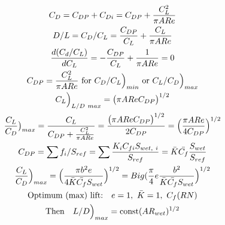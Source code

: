 \documentclass[draft=false, titlepage]{article}
\begin{document}
\begin{gather*}
\renewcommand{\arraystretch}{3.0}
    C_D = C_{DP} + C_{Di} = C_{DP} + \frac{C_L^2}{\pi AR e}\\
    D/L = C_D/C_L = \frac{C_{DP}}{C_L} + \frac{C_L}{\pi AR e}\\
    \frac{d(C_d/C_L)}{dC_L} = -\frac{C_{DP}}{C_L} + \frac{1}{\pi AR e} = 0\\
    C_{DP} = \frac{C_L^2}{\pi AR e} \text{ for } C_D/C_L\Big)_{min} \text{ or } C_L/C_D\Big)_{max}\\
    C_L\Big)_{L/D\ max} = \big( \pi AR e C_{DP}\big)^{1/2}\\
    \frac{C_L}{C_D}\big)_{max} = \frac{C_L}{C_{DP} + \frac{C_L^2}{\pi AR e}} =
    \frac{\big( \pi AR e C_{DP}\big)^{1/2}}{2C_{DP}} = \Big(\frac{\pi AR e}{4 C_{DP}}\Big)^{1/2}\\
    C_{DP} = \sum f_i/S_{ref} = \sum\frac{K_i C_{fi} S_{wet,\ i}}{S_{ref}} =
    \bar{K} \bar{C_f} \frac{S_{wet}}{S_{ref}}\\
    \frac{C_L}{C_D}\Big)_{max} = \Big(\frac{\pi b^2 e}{4 \bar{K} \bar{C_f} S_{wet}}\Big)^{1/2} =
    Big( \frac{\pi}{4} e \frac{b^2}{\bar{K}\bar{C_f} S_{wet}}\Big)^{1/2}\\
    \text{Optimum (max) lift:} \quad e=1,\ \bar{K}=1,\ C_f(RN)\\
    \text{Then} \quad L/D\Big)_{max} = \text{const}(AR_{wet})^{1/2}
\end{gather*}
\end{document}
